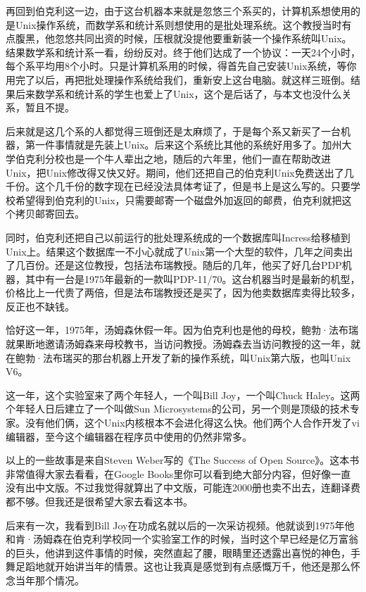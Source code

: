 \documentclass[
  letterpaper,
  DIV=11,
  numbers=noendperiod]{scrreprt}
\begin{document}
再回到伯克利这一边，由于这台机器本来就是忽悠三个系买的，计算机系想使用的是Unix操作系统，而数学系和统计系则想使用的是批处理系统。这个教授当时有点腹黑，他忽悠共同出资的时候，压根就没提他要重新装一个操作系统叫Unix。结果数学系和统计系一看，纷纷反对。终于他们达成了一个协议：一天24个小时，每个系平均用8个小时。只是计算机系用的时候，得首先自己安装Unix系统，等你用完了以后，再把批处理操作系统给我们，重新安上这台电脑。就这样三班倒。结果后来数学系和统计系的学生也爱上了Unix，这个是后话了，与本文也没什么关系，暂且不提。

后来就是这几个系的人都觉得三班倒还是太麻烦了，于是每个系又新买了一台机器，第一件事情就是先装上Unix。后来这个系统比其他的系统好用多了。加州大学伯克利分校也是一个牛人辈出之地，随后的六年里，他们一直在帮助改进Unix，把Unix修改得又快又好。期间，他们还把自己的伯克利Unix免费送出了几千份。这个几千份的数字现在已经没法具体考证了，但是书上是这么写的。只要学校希望得到伯克利的Unix，只需要邮寄一个磁盘外加返回的邮费，伯克利就把这个拷贝邮寄回去。

同时，伯克利还把自己以前运行的批处理系统成的一个数据库叫Incress给移植到Unix上。结果这个数据库一不小心就成了Unix第一个大型的软件，几年之间卖出了几百份。还是这位教授，包括法布瑞教授。随后的几年，他买了好几台PDP机器，其中有一台是1975年最新的一款叫PDP-11/70。这台机器当时是最新的机型，价格比上一代贵了两倍，但是法布瑞教授还是买了，因为他卖数据库卖得比较多，反正也不缺钱。

恰好这一年，1975年，汤姆森休假一年。因为伯克利也是他的母校，鲍勃·法布瑞就果断地邀请汤姆森来母校教书，当访问教授。汤姆森去当访问教授的这一年，就在鲍勃·法布瑞买的那台机器上开发了新的操作系统，叫Unix第六版，也叫Unix
V6。

这一年，这个实验室来了两个年轻人，一个叫Bill Joy，一个叫Chuck
Haley。这两个年轻人日后建立了一个叫做Sun
Microsystems的公司，另一个则是顶级的技术专家。没有他们俩，这个Unix内核根本不会进化得这么快。他们两个人合作开发了vi编辑器，至今这个编辑器在程序员中使用的仍然非常多。

以上的一些故事是来自Steven Weber写的《The Success of Open
Source》。这本书非常值得大家去看看，在Google
Books里你可以看到绝大部分内容，但好像一直没有出中文版。不过我觉得就算出了中文版，可能连2000册也卖不出去，连翻译费都不够。但我还是很希望大家去看这本书。

后来有一次，我看到Bill
Joy在功成名就以后的一次采访视频。他就谈到1975年他和肯·汤姆森在伯克利学校同一个实验室工作的时候，当时这个早已经是亿万富翁的巨头，他讲到这件事情的时候，突然直起了腰，眼睛里还透露出喜悦的神色，手舞足蹈地就开始讲当年的情景。这也让我真是感觉到有点感慨万千，他还是那么怀念当年那个情况。
\end{document}
